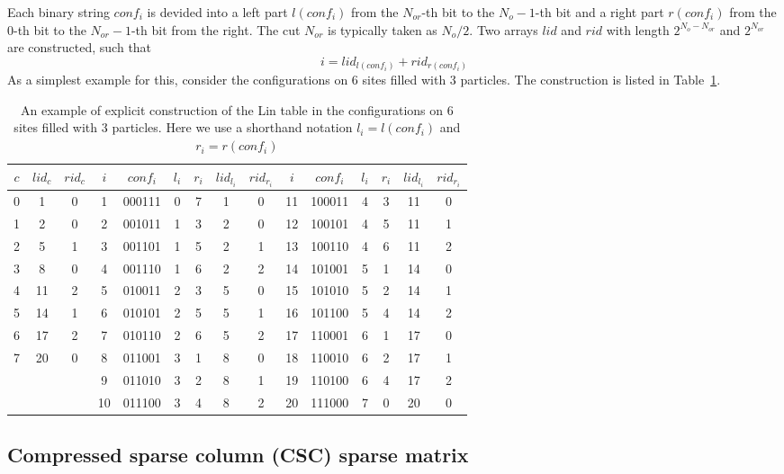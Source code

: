 \documentclass{timesjhep}
\begin{document}
Each binary string $conf_i$ is devided into a left part $l(conf_i)$ from the $N_{or}$-th bit to the $N_o-1$-th bit and a right part $r(conf_i)$ from the $0$-th bit to the $N_{or}-1$-th bit from the right. The cut $N_{or}$ is typically taken as $N_o/2$. Two arrays $lid$ and $rid$ with length $2^{N_o-N_{or}}$ and $2^{N_{or}}$ are constructed, such that 
\begin{equation}
    i=lid_{l(conf_i)}+rid_{r(conf_i)}
\end{equation}
As a simplest example for this, consider the configurations on 6 sites filled with 3 particles. The construction is listed in Table~\ref{tbl:lin_eg}.

\begin{table}[htbp]
    \centering
    \begin{tabular}{ccc|cccccc|cccccc}
        \hline\hline
        $c$&$lid_c$&$rid_c$&$i$&$conf_i$&$l_i$&$r_i$&$lid_{l_i}$&$rid_{r_i}$&$i$&$conf_i$&$l_i$&$r_i$&$lid_{l_i}$&$rid_{r_i}$\\
        \hline
        0& 1&0& 1&000111&0&7&1&0&11&100011&4&3&11&0\\
        1& 2&0& 2&001011&1&3&2&0&12&100101&4&5&11&1\\
        2& 5&1& 3&001101&1&5&2&1&13&100110&4&6&11&2\\
        3& 8&0& 4&001110&1&6&2&2&14&101001&5&1&14&0\\
        4&11&2& 5&010011&2&3&5&0&15&101010&5&2&14&1\\
        5&14&1& 6&010101&2&5&5&1&16&101100&5&4&14&2\\
        6&17&2& 7&010110&2&6&5&2&17&110001&6&1&17&0\\
        7&20&0& 8&011001&3&1&8&0&18&110010&6&2&17&1\\
         &  & & 9&011010&3&2&8&1&19&110100&6&4&17&2\\
         &  & &10&011100&3&4&8&2&20&111000&7&0&20&0\\
        \hline\hline
    \end{tabular}
    \caption{An example of explicit construction of the Lin table in the configurations on 6 sites filled with 3 particles. Here we use a shorthand notation $l_i=l(conf_i)$ and $r_i=r(conf_i)$}
    \label{tbl:lin_eg}
\end{table}

\subsection{Compressed sparse column (CSC) sparse matrix} 
\label{app:data_csc}
\end{document}
